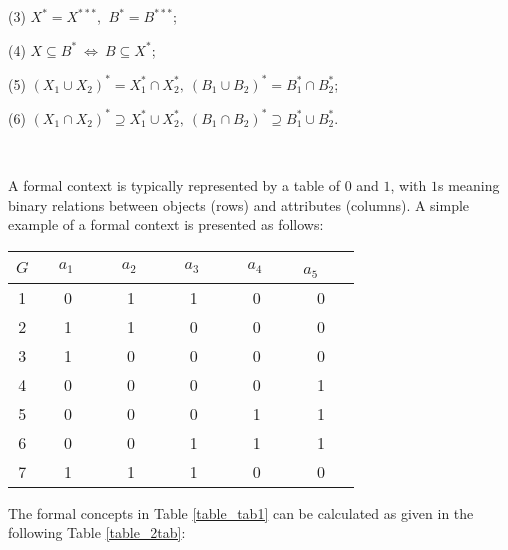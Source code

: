 \documentclass[11pt]{article}
\numberwithin{equation}{subsection}
\begin{document}
(3) $X^* = X^{***}$, $\ B^* = B^{***}$;

(4) $X \subseteq B^{*}\ \Leftrightarrow\ B \subseteq X^{*}$;

(5) $(X_1\cup X_2)^* = X^*_1\cap X^*_2, \ (B_1\cup B_2)^* = B^*_1\cap B^*_2$;

(6) $(X_1\cap X_2)^* \supseteq   X^*_1\cup X^*_2, \ (B_1\cap B_2)^* \supseteq B^*_1\cup B^*_2$.

\

 A formal context is typically represented by a  table of $0$ and $1$, with $1$s meaning binary relations between objects (rows) and attributes (columns). A simple example of a formal context is presented as follows:



 \begin{table*}[ht]
            \begin{center}
                \begin{normalsize}
                    \caption{Formal context $(G, M, I)$}
                    \label{table_tab1}
                    \begin{tabular}
                        {|c|c c  c  c  c|}
                        \hline
                        $G$     & $\ \ \ \ a_1\ \ \ \ \ $       &  $\ \ \ \ a_2\ \ \ \ \ $  &  $\ \ \ \ a_3\ \ \ \ \ $  & $\ \ \ \ a_4\ \ \ \ \ $  &  $\ \ a_5$\ \ \  \\
                       \hline
 1 & 0   & 1  &  1  & 0 &  0  \\

 2 & 1  &  1  & 0 &  0  &  0   \\

 3 & 1   & 0 &  0  &  0  &  0   \\

4 & 0 &  0  &  0  &  0  &   1  \\

5 & 0 &  0  &  0  &  1 &   1  \\

6 & 0 &  0  &  1  &  1 &   1  \\

7 & 1 &  1  &  1  &  0 &   0  \\
\hline
                    \end{tabular}
                \end{normalsize}
            \end{center}
        \end{table*}



 The formal concepts in  Table \ref{table_tab1}  can be calculated as  given in the following Table \ref{table_2tab}:
\end{document}
